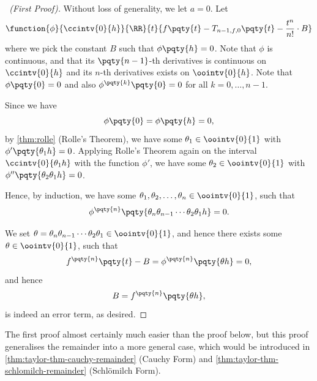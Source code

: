 \begin{proof}[\proofname\ (First Proof)]
    Without loss of generality, we let \(a = 0\). Let
    \[
        \function{\phi}{\ccintv{0}{h}}{\RR}{t}{f\pqty{t} - T_{n - 1, f, 0} \pqty{t} - \frac{t^n}{n!} \cdot B}
    \]
    where we pick the constant \(B\) such that \(\phi\pqty{h} = 0\). Note that \(\phi\) is continuous, and that its \(\pqty{n - 1}\)-th derivatives is continuous on \(\ccintv{0}{h}\) and its \(n\)-th derivatives exists on \(\oointv{0}{h}\). Note that \(\phi\pqty{0} = 0\) and also \(\phi^{\pqty{k}} \pqty{0} = 0\) for all \(k = 0, \ldots, n - 1\).

    Since we have
    \[
        \phi\pqty{0} = \phi\pqty{h} = 0,
    \] 
    by \autoref{thm:rolle} (Rolle's Theorem), we have some \(\theta_1 \in \oointv{0}{1}\) with \(\phi'\pqty{\theta_1 h} = 0\). Applying Rolle's Theorem again on the interval \(\ccintv{0}{\theta_1 h}\) with the function \(\phi'\), we have some \(\theta_2 \in \oointv{0}{1}\) with \(\phi''\pqty{\theta_2 \theta_1 h} = 0\).

    Hence, by induction, we have some \(\theta_1, \theta_2, \ldots, \theta_n \in \oointv{0}{1}\), such that
    \[
        \phi^{\pqty{n}} \pqty{\theta_n \theta_{n - 1} \cdots \theta_{2} \theta_{1} h} = 0.
    \]

    We set \(\theta = \theta_n \theta_{n - 1} \cdots \theta_{2} \theta_{1} \in \oointv{0}{1}\), and hence there exists some \(\theta \in \oointv{0}{1}\), such that
    \[
        f^{\pqty{n}} \pqty{t} - B = \phi^{\pqty{n}} \pqty{\theta h} = 0,
    \]
    and hence
    \[
        B = f^{\pqty{n}} \pqty{\theta h},
    \]
    is indeed an error term, as desired.
\end{proof}

The first proof almost certainly much easier than the proof below, but this proof generalises the remainder into a more general case, which would be introduced in \autoref{thm:taylor-thm-cauchy-remainder} (Cauchy Form) and \autoref{thm:taylor-thm-schlomilch-remainder} (Schl\"{o}milch Form).

